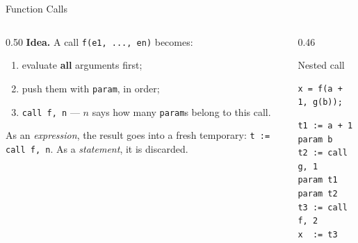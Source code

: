 \documentclass[aspectratio=169,11pt,xcolor=table]{beamer}
\newcommand{\tc}[1]{\texttt{#1}}
\begin{document}
\begin{frame}[fragile]{Function Calls}
  \begin{columns}[T]
    \begin{column}{0.50\textwidth}
      \textbf{Idea.} A call \tc{f(e1, ..., en)} becomes:
      \begin{enumerate}
        \item evaluate \textbf{all} arguments first;
        \item push them with \tc{param}, in order;
        \item \tc{call f, n} — $n$ says how many \tc{param}s belong to this call.
      \end{enumerate}
      As an \emph{expression}, the result goes into a fresh temporary:
      \tc{t := call f, n}. As a \emph{statement}, it is discarded.
    \end{column}
    \begin{column}{0.46\textwidth}
      \begin{block}{Nested call}
        \begin{verbatim}
x = f(a + 1, g(b));
        \end{verbatim}
        \vspace{0.2em}
        \begin{verbatim}
t1 := a + 1
param b
t2 := call g, 1
param t1
param t2
t3 := call f, 2
x  := t3
        \end{verbatim}
      \end{block}
    \end{column}
  \end{columns}
\end{frame}
\end{document}
